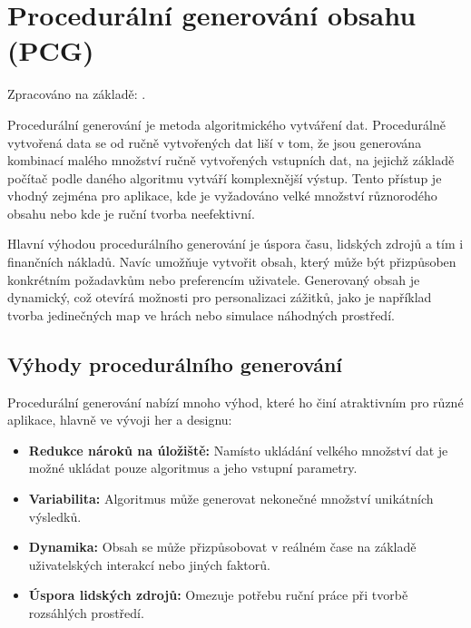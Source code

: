 \lstset{style=mystyle}
\renewcommand\lstlistingname{Ukázka}
\renewcommand\lstlistlistingname{Ukázky kódu}

\section{Procedurální generování obsahu (PCG)}

Zpracováno na základě: \cite{PCGinG} \cite{HistoryOfPCG}.

Procedurální generování je metoda algoritmického vytváření dat. Procedurálně vytvořená data se od ručně vytvořených dat liší v tom, že jsou generována kombinací malého množství ručně vytvořených vstupních dat, na jejichž základě počítač podle daného algoritmu vytváří komplexnější výstup. Tento přístup je vhodný zejména pro aplikace, kde je vyžadováno velké množství různorodého obsahu nebo kde je ruční tvorba neefektivní.

Hlavní výhodou procedurálního generování je úspora času, lidských zdrojů a tím i finančních nákladů. Navíc umožňuje vytvořit obsah, který může být přizpůsoben konkrétním požadavkům nebo preferencím uživatele. Generovaný obsah je dynamický, což otevírá možnosti pro personalizaci zážitků, jako je například tvorba jedinečných map ve hrách nebo simulace náhodných prostředí.

\subsection{Výhody procedurálního generování}
Procedurální generování nabízí mnoho výhod, které ho činí atraktivním pro různé aplikace, hlavně ve vývoji her a designu:
\begin{itemize}
    \item \textbf{Redukce nároků na úložiště:} Namísto ukládání velkého množství dat je možné ukládat pouze algoritmus a jeho vstupní parametry.
    \item \textbf{Variabilita:} Algoritmus může generovat nekonečné množství unikátních výsledků.
    \item \textbf{Dynamika:} Obsah se může přizpůsobovat v reálném čase na základě uživatelských interakcí nebo jiných faktorů.
    \item \textbf{Úspora lidských zdrojů:} Omezuje potřebu ruční práce při tvorbě rozsáhlých prostředí.
\end{itemize}

